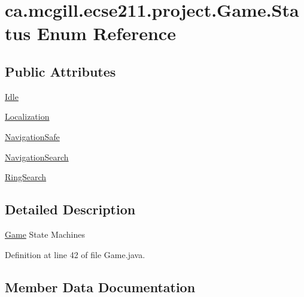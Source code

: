 \hypertarget{enumca_1_1mcgill_1_1ecse211_1_1project_1_1_game_1_1_status}{}\section{ca.\+mcgill.\+ecse211.\+project.\+Game.\+Status Enum Reference}
\label{enumca_1_1mcgill_1_1ecse211_1_1project_1_1_game_1_1_status}
\subsection*{Public Attributes}
\begin{DoxyCompactItemize}
\item 
\hyperlink{enumca_1_1mcgill_1_1ecse211_1_1project_1_1_game_1_1_status_a4ee6ac6711e6f0f96cfbe832f260c89f}{Idle}
\item 
\hyperlink{enumca_1_1mcgill_1_1ecse211_1_1project_1_1_game_1_1_status_a25cbd0accfe5929018d9f5e6664f0ea7}{Localization}
\item 
\hyperlink{enumca_1_1mcgill_1_1ecse211_1_1project_1_1_game_1_1_status_a1d354aa5f3c05a88b5635633b9f7224e}{Navigation\+Safe}
\item 
\hyperlink{enumca_1_1mcgill_1_1ecse211_1_1project_1_1_game_1_1_status_a3a948816e04ceb3fc752be54f504fb1c}{Navigation\+Search}
\item 
\hyperlink{enumca_1_1mcgill_1_1ecse211_1_1project_1_1_game_1_1_status_a6cb7397203bf9fa47c9486ede1e8fd6d}{Ring\+Search}
\end{DoxyCompactItemize}


\subsection{Detailed Description}
\hyperlink{enumca_1_1mcgill_1_1ecse211_1_1project_1_1_game}{Game} State Machines 

Definition at line 42 of file Game.\+java.



\subsection{Member Data Documentation}
\mbox{\label{enumca_1_1mcgill_1_1ecse211_1_1project_1_1_game_1_1_status_a4ee6ac6711e6f0f96cfbe832f260c89f}} 
